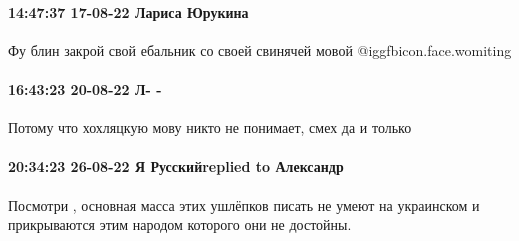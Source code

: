  
 
 
 
 

\paragraph{14:47:37 17-08-22 Лариса Юрукина}

Фу блин закрой свой ебальник со своей свинячей мовой  @igg{fbicon.face.womiting} 

\paragraph{16:43:23 20-08-22 Л- -}

Потому что хохляцкую мову никто не понимает, смех да и только

\paragraph{20:34:23 26-08-22 Я Русскийreplied to Александр}

Посмотри , основная масса этих ушлёпков писать не умеют на украинском и
прикрываются этим народом которого они не достойны.
